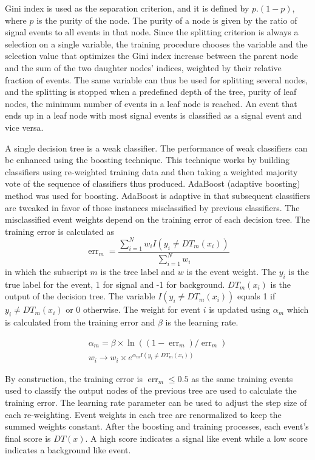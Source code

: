 Gini index is used as the separation criterion, and it is defined by $p.(1 - p)$, where $p$ is the purity of the node. The purity of a node is given by the ratio of signal events to all events in that node. Since the splitting criterion is always a selection on a single variable, the training procedure chooses the variable and the selection value that optimizes the Gini index increase between the parent node and the sum of the two daughter nodes' indices, weighted by their relative fraction of events. The same variable can thus be used for splitting several nodes, and the splitting is stopped when a predefined depth of the tree, purity of leaf nodes, the minimum number of events in a leaf node is reached. An event that ends up in a leaf node with most signal events is classified as a signal event and vice versa.

A single decision tree is a weak classifier. The performance of weak classifiers can be enhanced using the boosting technique. This technique works by building classifiers using re-weighted training data and then taking a weighted majority vote of the sequence of classifiers thus produced. AdaBoost (adaptive boosting) method was used for boosting. AdaBoost is adaptive in that subsequent classifiers are tweaked in favor of those instances misclassified by previous classifiers. The misclassified event weights depend on the training error of each decision tree. The training error is calculated as
%
\begin{equation}
  \operatorname{err}_{m}=\frac{\sum_{i=1}^{N} w_{i} I\left(y_{i} \neq DT_{m}\left(x_{i}\right)\right)}{\sum_{i=1}^{N} w_{i}}
\end{equation}
%
in which the subscript $m$ is the tree label and $w$ is the event weight. The $y_{i}$ is the true label for the event, 1 for signal and -1 for background. $DT_{m}(x_{i})$ is the output of the decision tree. The variable $I(y_{i} \neq DT_{m}(x_{i}))$ equals 1 if $y_{i} \neq DT_{m}(x_{i})$ or 0 otherwise. The weight for event $i$ is updated using $\alpha_{m}$ which is calculated from the training error and $\beta$ is the learning rate.

\begin{align}
  \alpha_{m}=\beta \times \ln \left(\left(1-\operatorname{err}_{m}\right) / \operatorname{err}_{m}\right) \\
  w_{i} \rightarrow w_{i} \times e^{\alpha_{m} I\left(y_{i} \neq DT_{m}\left(x_{i}\right)\right)}
\end{align}

By construction, the training error is $\operatorname{err}_{m} \leq 0.5$ as the same training events used to classify the output nodes of the previous tree are used to calculate the training error. The learning rate parameter can be used to adjust the step size of each re-weighting. Event weights in each tree are renormalized to keep the summed weights constant. After the boosting and training processes, each event's final score is $DT(x)$. A high score indicates a signal like event while a low score indicates a background like event.

